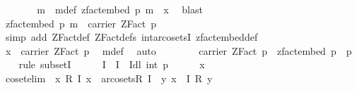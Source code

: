 \begin{isabellebody}
\ \ \ \ \isamarkupfalse%
\ \isamarkupfalse%
\ m\ \ m{\isacharunderscore}{\kern0pt}def{\isacharcolon}{\kern0pt}\ {\isachardoublequoteopen}zfact{\isacharunderscore}{\kern0pt}embed\ p\ m\ {\isacharequal}{\kern0pt}\ x{\isachardoublequoteclose}\ \isamarkupfalse%
\ blast\isanewline
\ \ \ \ \isamarkupfalse%
\ {\isachardoublequoteopen}zfact{\isacharunderscore}{\kern0pt}embed\ p\ m\ {\isasymin}\ carrier\ {\isacharparenleft}{\kern0pt}ZFact\ p{\isacharparenright}{\kern0pt}{\isachardoublequoteclose}\ \isanewline
\ \ \ \ \ \ \isamarkupfalse%
\ {\isacharparenleft}{\kern0pt}simp\ add{\isacharcolon}{\kern0pt}\ ZFact{\isacharunderscore}{\kern0pt}def\ ZFact{\isacharunderscore}{\kern0pt}defs{\isacharparenleft}{\kern0pt}{}{\isacharparenright}{\kern0pt}\ int{\isachardot}{\kern0pt}a{\isacharunderscore}{\kern0pt}rcosetsI\ zfact{\isacharunderscore}{\kern0pt}embed{\isacharunderscore}{\kern0pt}def{\isacharparenright}{\kern0pt}\isanewline
\ \ \ \ \isamarkupfalse%
\ {\isachardoublequoteopen}x\ {\isasymin}\ carrier\ {\isacharparenleft}{\kern0pt}ZFact\ p{\isacharparenright}{\kern0pt}{\isachardoublequoteclose}\ \isamarkupfalse%
\ m{\isacharunderscore}{\kern0pt}def\ \isamarkupfalse%
\ auto\isanewline
\ \ \isamarkupfalse%
\isanewline
\ \ \isamarkupfalse%
\ \isamarkupfalse%
\ {\isachardoublequoteopen}carrier\ {\isacharparenleft}{\kern0pt}ZFact\ p{\isacharparenright}{\kern0pt}\ {\isasymsubseteq}\ zfact{\isacharunderscore}{\kern0pt}embed\ p\ {\isacharbackquote}{\kern0pt}\ {\isacharbraceleft}{\kern0pt}{}{\isachardot}{\kern0pt}{\isachardot}{\kern0pt}{\isacharless}{\kern0pt}p{\isacharbraceright}{\kern0pt}{\isachardoublequoteclose}\isanewline
\ \ \isamarkupfalse%
\ {\isacharparenleft}{\kern0pt}rule\ subsetI{\isacharparenright}{\kern0pt}\isanewline
\ \ \ \ \isamarkupfalse%
\ I\ \ {\isachardoublequoteopen}I\ {\isacharequal}{\kern0pt}\ Idl\isactrlbsub {\isasymZ}\isactrlesub \ {\isacharbraceleft}{\kern0pt}int\ p{\isacharbraceright}{\kern0pt}{\isachardoublequoteclose}\isanewline
\ \ \ \ \isamarkupfalse%
\ x\isanewline
\ \ \ \ \isamarkupfalse%
\ coset{\isacharunderscore}{\kern0pt}elim{\isacharcolon}{\kern0pt}\ {\isachardoublequoteopen}{\isasymAnd}\ x\ R\ I{\isachardot}{\kern0pt}\ x\ {\isasymin}\ a{\isacharunderscore}{\kern0pt}rcosets\isactrlbsub R\isactrlesub \ I\ {\isasymLongrightarrow}\ {\isacharparenleft}{\kern0pt}{\isasymexists}y{\isachardot}{\kern0pt}\ x\ {\isacharequal}{\kern0pt}\ I\ {\isacharplus}{\kern0pt}{\isachargreater}{\kern0pt}\isactrlbsub R\isactrlesub \ y{\isacharparenright}{\kern0pt}{\isachardoublequoteclose}\isanewline

\end{isabellebody}
